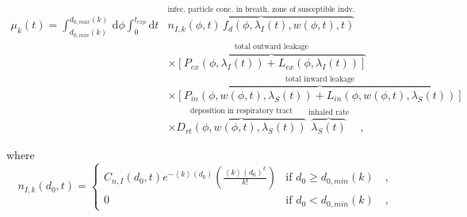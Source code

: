 \documentclass[preprint]{elsarticle}
\newcommand{\expectedk}[1]{\ensuremath{\left<k\right>\!\left(#1\right)}}
\begin{document}
\begin{equation}
\begin{aligned}
 \mu_{k}(t)   = \int_{d_{0, min}(k)}^{d_{0, max}(k)}  \, \mathrm{d}\phi \int_{0}^{t_{exp}} \mathrm{d}t &\!  \overbrace{ n_{I, k}(\phi, t) \,  f_d\left(\phi, \lambda_{I}(t), w(\phi, t), t\right)}^\text{infec. particle conc. in breath. zone of susceptible indv.} \\
	& \times  \overbrace{\left[ P_{ex}(\phi, \lambda_{I}(t))+L_{ex}(\phi, \lambda_{I}(t))\right]}^\text{total outward leakage}\\
	& \times  \overbrace{\left[ P_{in}(\phi, w(\phi, t), \lambda_{S}(t)) +L_{in}(\phi, w(\phi, t), \lambda_{S}(t))\right]}^\text{total inward leakage}\\
	& \times  \overbrace{D_{rt}(\phi, w(\phi, t), \lambda_{S}(t))}^\text{deposition in respiratory tract}\, \overbrace{\lambda_{S}(t)}^\text{inhaled rate} \quad ,
\end{aligned}
	\label{eqn:absorbed_dose_full}
\end{equation}

\noindent where 
\begin{equation}
	n_{I, k}(d_0,t) =
	\begin{cases}
		C_{n, I}\left(d_0, t\right) e^{-\expectedk{d_0}} \left(\frac{\expectedk{d_0}^k}{k!}\right) & \text{if $d_0 \ge d_{0, min}(k)$} \quad , \\
		0 & \text{if $d_0 < d_{0, min}(k)$} \quad ,
	\end{cases}
	\label{eqn:infectious_production_nk_by_d0}
\end{equation}
\end{document}
